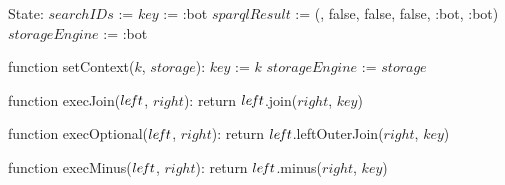 State:
    $searchIDs$ := {}
    $key$ := :bot
    $sparqlResult$ := ({}, false, false, false, :bot, :bot)
    $storageEngine$ := :bot

function setContext($k$, $storage$):
    $key$ := $k$
    $storageEngine$ := $storage$

function execJoin($le\textrm{\emph{f}}t$, $right$):
    return $le\textrm{\emph{f}}t$.join($right$, $key$)

function execOptional($le\textrm{\emph{f}}t$, $right$):
    return $le\textrm{\emph{f}}t$.leftOuterJoin($right$, $key$)

function execMinus($le\textrm{\emph{f}}t$, $right$):
    return $le\textrm{\emph{f}}t$.minus($right$, $key$)